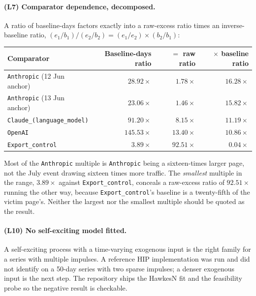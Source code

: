 \documentclass[11pt,a4paper]{article}
\begin{document}
\paragraph{(L7) Comparator dependence, decomposed.} A ratio of baseline-days
factors exactly into a raw-excess ratio times an inverse-baseline ratio,
$(e_1/b_1)/(e_2/b_2) = (e_1/e_2)\times(b_2/b_1)$:

\begin{center}
\small
\begin{tabular}{lrrr}
\toprule
Comparator & Baseline-days ratio & $=$ raw ratio & $\times$ baseline ratio \\\midrule
\texttt{Anthropic} (12 Jun anchor) & $28.92\times$ & $1.78\times$ & $16.28\times$ \\
\texttt{Anthropic} (13 Jun anchor) & $23.06\times$ & $1.46\times$ & $15.82\times$ \\
\texttt{Claude\_(language\_model)}  & $91.20\times$ & $8.15\times$ & $11.19\times$ \\
\texttt{OpenAI}                    & $145.53\times$ & $13.40\times$ & $10.86\times$ \\
\texttt{Export\_control}           & $3.89\times$ & $92.51\times$ & $0.04\times$ \\
\bottomrule
\end{tabular}
\end{center}

\noindent Most of the \texttt{Anthropic} multiple is \texttt{Anthropic} being a
sixteen-times larger page, not the July event drawing sixteen times more
traffic. The \emph{smallest} multiple in the range, $3.89\times$ against
\texttt{Export\_control}, conceals a raw-excess ratio of $92.51\times$ running
the other way, because \texttt{Export\_control}'s baseline is a twenty-fifth of
the victim page's. Neither the largest nor the smallest multiple should be
quoted as the result.

\paragraph{(L10) No self-exciting model fitted.} A self-exciting process with a
time-varying exogenous input \cite{crane2008robust,rizoiu2016hip} is the right
family for a series with multiple impulses. A reference HIP implementation was
run and did not identify on a 50-day series with two sparse impulses; a denser
exogenous input is the next step. The repository ships the HawkesN fit and the
feasibility probe so the negative result is checkable.
\end{document}
